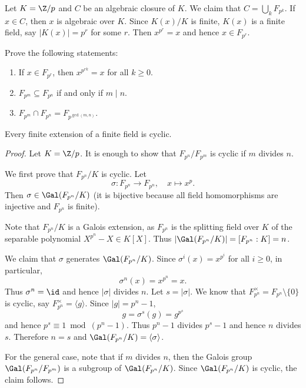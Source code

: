 Let $K=\Z/p$ and $C$ be an algebraic closure of $K$. 
We claim that $C=\bigcup_k F_{p^k}$. If $x\in C$, then $x$ is algebraic over $K$. 
Since $K(x)/K$ is finite, $K(x)$ is a finite field, say 
$|K(x)|=p^r$ for some $r$. Then $x^{p^r}=x$ and hence $x\in F_{p^r}$. 

\begin{exercise}
    Prove the following statements:
    \begin{enumerate}
        \item If $x\in F_{p^r}$, then $x^{p^{rk}}=x$ for all $k\geq0$.
        \item $F_{p^m}\subseteq F_{p^n}$ if and only if $m\mid n$. 
        \item $F_{p^m}\cap F_{p^n}=F_{p^{\gcd(m,n)}}$.
    \end{enumerate}
\end{exercise}

\begin{proposition}
    Every finite extension of a finite field is cyclic. 
\end{proposition}

\begin{proof}
    Let $K=\Z/p$. It is enough to show that $F_{p^n}/F_{p^m}$ is cyclic if $m$ divides $n$. 
    
    We first prove that $F_{p^n}/K$ is cyclic. 
    Let 
    \[
    \sigma\colon F_{p^n}\to F_{p^n},\quad 
    x\mapsto x^p.
    \]
    Then 
    $\sigma\in\Gal(F_{p^n}/K)$ (it is bijective because all field homomorphisms 
    are injective and $F_{p^n}$ is finite). 

    Note that 
    $F_{p^n}/K$ is a Galois extension, as $F_{p^n}$ is the splitting
    field over $K$ 
    of the separable polynomial $X^{p^n}-X\in K[X]$. 
    Thus $|\Gal(F_{p^n}/K)|=[F_{p^n}:K]=n$. 
    
    We claim that $\sigma$ generates $\Gal(F_{p^n}/K)$. Since 
    $\sigma^i(x)=x^{p^i}$ for all $i\geq 0$, in particular, 
    \[
    \sigma^n(x)=x^{p^n}=x.
    \]
    Thus $\sigma^n=\id$ and hence $|\sigma|$ divides $n$. Let 
    $s=|\sigma|$. We know that $F_{p^n}^{\times}=F_{p^n}\setminus\{0\}$ is
    cyclic, say $F_{p^n}^{\times}=\langle g\rangle$. Since $|g|=p^n-1$, 
    \[
    g=\sigma^s(g)=g^{p^s}
    \]
    and hence $p^s\equiv 1\bmod (p^n-1)$. Thus $p^n-1$ divides $p^s-1$ and
    hence $n$ divides $s$. Therefore $n=s$ and $\Gal(F_{p^n}/K)=\langle\sigma\rangle$. 
    
    For the general case, note that if $m$ divides $n$, 
    then the Galois group 
    $\Gal(F_{p^n}/F_{p^m})$ is a subgroup of $\Gal(F_{p^n}/K)$. Since  $\Gal(F_{p^n}/K)$ is cyclic, 
    the claim follows.
\end{proof}

